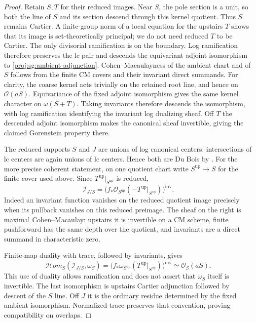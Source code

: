 \documentclass[11pt,letterpaper]{article}
\theoremstyle{definition}
\theoremstyle{remark}
\begin{document}
\begin{proof}
Retain $S,T$ for their reduced images.  Near $S$, the pole
section is a unit, so both the line of $S$ and its section
descend through this kernel quotient.  Thus $S$ remains
Cartier.  A finite-group norm of a local equation for the
upstairs $T$ shows that its image is set-theoretically
principal; we do not need reduced $T$ to be Cartier.
The only divisorial ramification is on the boundary.
Log ramification therefore preserves the lc pair and descends
the equivariant adjoint isomorphism to
\eqref{proj:sg:ambient-adjunction}.  Cohen--Macaulayness of the
ambient chart and of $S$ follows from the finite CM covers
and their invariant direct summands.  For clarity, the
coarse kernel acts trivially on the retained root line,
and hence on $\mathcal{O}(aS)$.  Equivariance of the fixed adjoint
isomorphism gives the same kernel character on
$\omega(S+T)$.  Taking invariants therefore descends the
isomorphism, with log ramification identifying the
invariant log dualizing sheaf.  Off $T$ the descended
adjoint isomorphism makes the canonical sheaf invertible,
giving the claimed Gorenstein property there.

The reduced supports $S$ and $J$ are unions of log canonical
centers: intersections of lc centers are again unions of
lc centers.  Hence both are Du Bois by
\cite[Theorems~1.4 and~1.7]{Proj-KollarKovacs2010}.
For the more precise coherent statement, on one quotient
chart write $S^{\mathrm{up}}\to S$ for the finite cover used
above.  Since $T^{\mathrm{up}}|_{S^{\mathrm{up}}}$ is reduced,
\[
 \mathcal I_{J/S}
 =
 \bigl(f_*\mathcal{O}_{S^{\mathrm{up}}}
       (-T^{\mathrm{up}}|_{S^{\mathrm{up}}})\bigr)^{\mathrm{inv}}.
\]
Indeed an invariant function vanishes on the reduced quotient
image precisely when its pullback vanishes on this reduced
preimage.  The sheaf on the right is maximal Cohen--Macaulay:
upstairs it is invertible on a CM scheme, finite pushforward
has the same depth over the quotient, and invariants are a
direct summand in characteristic zero.

Finite-map duality with trace, followed by invariants, gives
\[
 \mathcal Hom_S(\mathcal I_{J/S},\omega_S)
 =
 \bigl(f_*\omega_{S^{\mathrm{up}}}
       (T^{\mathrm{up}}|_{S^{\mathrm{up}}})\bigr)^{\mathrm{inv}}
 \simeq\mathcal{O}_S(aS).
\]
This use of duality allows ramification and does not assert
that $\omega_S$ itself is invertible.  The last isomorphism
is upstairs Cartier adjunction followed by descent of the
$S$ line.  Off $J$ it is the ordinary residue determined by
the fixed ambient isomorphism.  Normalized trace preserves
that convention, proving compatibility on overlaps.


\end{proof}
\end{document}
